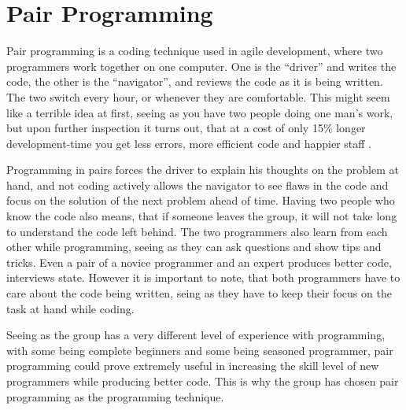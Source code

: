 \section{Pair Programming}
Pair programming is a coding technique used in agile development, where two programmers work together on one computer. 
One is the ``driver'' and writes the code, the other is the ``navigator'', and reviews the code as it is being written. 
The two switch every hour, or whenever they are comfortable. 
This might seem like a terrible idea at first, seeing as you have two people doing one man's work, 
but upon further inspection it turns out, that at a cost of only 15\% longer development-time 
you get less errors, more efficient code and happier staff \cite{cockburn00}. 

Programming in pairs forces the driver to explain his thoughts on the problem at hand, 
and not coding actively allows the navigator to see flaws in the code 
and focus on the solution of the next problem ahead of time. Having two people who know the code also
means, that if someone leaves the group, it will not take long to understand the code left behind.
The two programmers also learn from each other while programming, seeing as they can ask questions and show tips and tricks. Even a pair of a novice programmer and an expert produces better code, interviews state.\cite{cockburn00} However it is important to note, that both programmers have to care about the code being written, seing as they have to keep their focus on the task at hand while coding.

Seeing as the group has a very different level of experience with programming, with some being complete beginners and some being seasoned programmer, pair programming could prove extremely useful in increasing the skill level of new programmers while producing better code. This is why the group has chosen pair programming as the programming technique.